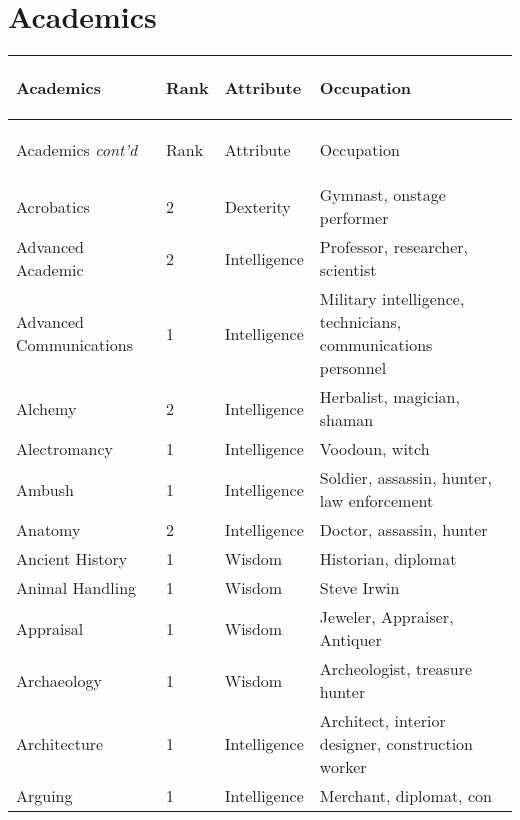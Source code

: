 \documentclass[twoside]{book}
\begin{document}
    

\chapter{Academics}
    
\begin{longtable}{p{1.25in}llp{12em}} 
  Academics& \begin{turn}{70}{Rank}\end{turn}
          & \begin{turn}{70}{Attribute}\end{turn}
          & \begin{turn}{70}{Occupation}\end{turn}
          \\
  \hline
  \hline
  \endfirsthead
  Academics \textit{cont'd}
        & \begin{turn}{70}{Rank}\end{turn}
          & \begin{turn}{70}{Attribute}\end{turn}
          & \begin{turn}{70}{Occupation}\end{turn}
           \\
  \hline
  \endhead
\raggedright Acrobatics & 2 & Dexterity & Gymnast, onstage
           performer \tabularnewline
      \raggedright Advanced Academic & 2 & Intelligence & Professor, researcher,
           scientist \tabularnewline
      \raggedright Advanced Communications
           & 1 & Intelligence & Military intelligence,
           technicians, communications personnel \tabularnewline
      \raggedright Alchemy & 2 & Intelligence & Herbalist, magician,
           shaman \tabularnewline
      \raggedright Alectromancy & 1 & Intelligence & Voodoun, witch \tabularnewline
      \raggedright Ambush & 1 & Intelligence & Soldier, assassin,
           hunter, law enforcement \tabularnewline
      \raggedright Anatomy & 2 & Intelligence & Doctor, assassin, hunter
           \tabularnewline
      \raggedright Ancient History & 1 & Wisdom & Historian, diplomat
           \tabularnewline
      \raggedright Animal Handling & 1 & Wisdom & Steve Irwin \tabularnewline
      \raggedright Appraisal & 1 & Wisdom & Jeweler, Appraiser,
           Antiquer \tabularnewline
      \raggedright Archaeology & 1 & Wisdom & Archeologist, treasure
           hunter \tabularnewline
      \raggedright Architecture & 1 & Intelligence & Architect, interior
           designer, construction worker \tabularnewline
      \raggedright Arguing & 1 & Intelligence & Merchant, diplomat, con

\end{longtable}
\end{document}
